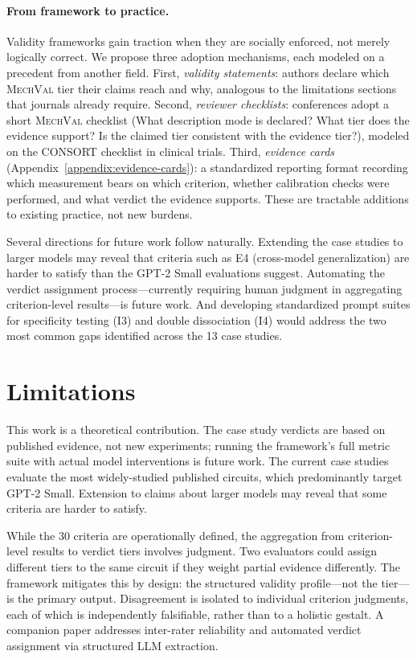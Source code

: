 \documentclass[10pt]{article}
\newcommand{\mechval}{\textsc{MechVal}}
\begin{document}
\paragraph{From framework to practice.}
Validity frameworks gain traction when they are socially enforced, not merely logically correct. We propose three adoption mechanisms, each modeled on a precedent from another field. First, \emph{validity statements}: authors declare which \mechval{} tier their claims reach and why, analogous to the limitations sections that journals already require. Second, \emph{reviewer checklists}: conferences adopt a short \mechval{} checklist (What description mode is declared? What tier does the evidence support? Is the claimed tier consistent with the evidence tier?), modeled on the CONSORT checklist in clinical trials. Third, \emph{evidence cards} (Appendix~\ref{appendix:evidence-cards}): a standardized reporting format recording which measurement bears on which criterion, whether calibration checks were performed, and what verdict the evidence supports. These are tractable additions to existing practice, not new burdens.

Several directions for future work follow naturally. Extending the case studies to larger models may reveal that criteria such as E4 (cross-model generalization) are harder to satisfy than the GPT-2 Small evaluations suggest. Automating the verdict assignment process---currently requiring human judgment in aggregating criterion-level results---is future work. And developing standardized prompt suites for specificity testing (I3) and double dissociation (I4) would address the two most common gaps identified across the 13 case studies.

\section{Limitations}
\label{sec:limitations}

This work is a theoretical contribution. The case study verdicts are based on published evidence, not new experiments; running the framework's full metric suite with actual model interventions is future work. The current case studies evaluate the most widely-studied published circuits, which predominantly target GPT-2 Small. Extension to claims about larger models may reveal that some criteria are harder to satisfy.

While the 30 criteria are operationally defined, the aggregation from criterion-level results to verdict tiers involves judgment. Two evaluators could assign different tiers to the same circuit if they weight partial evidence differently. The framework mitigates this by design: the structured validity profile---not the tier---is the primary output. Disagreement is isolated to individual criterion judgments, each of which is independently falsifiable, rather than to a holistic gestalt. A companion paper addresses inter-rater reliability and automated verdict assignment via structured LLM extraction.
\end{document}
